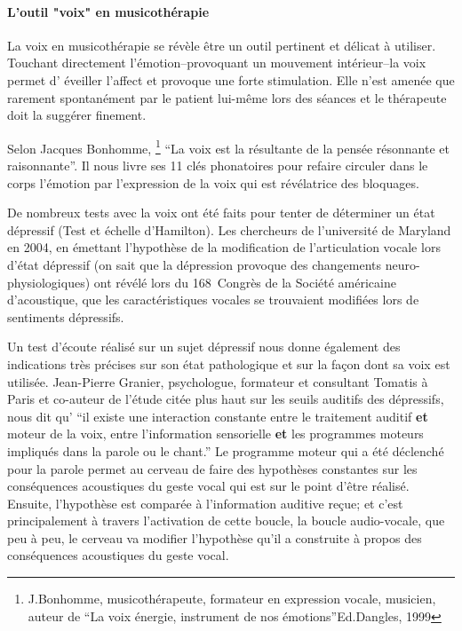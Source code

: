 \paragraph{L'outil "voix" en musicothérapie}

La voix en musicothérapie se révèle être un outil pertinent et délicat
à utiliser. Touchant 
directement 
l'émotion--provoquant un mouvement intérieur--la voix permet d'
éveiller l'affect
et provoque une forte stimulation. Elle n'est amenée que rarement
spontanément par le patient lui-même lors des séances et le thérapeute doit la suggérer
finement.

Selon Jacques Bonhomme, \footnote{J.Bonhomme, musicothérapeute, formateur 
  	en expression vocale, musicien, auteur de ``La voix énergie,
        instrument de nos émotions''Ed.Dangles, 1999} ``La voix est la
      résultante de la pensée résonnante et raisonnante''.
      Il nous livre ses 11 clés phonatoires pour refaire circuler dans
      le corps 
      l'émotion par l'expression de la voix qui est révélatrice des bloquages.

De nombreux tests avec 
la voix
 ont été faits pour tenter de déterminer un état dépressif 
(Test et échelle d'Hamilton). Les chercheurs de l'université de Maryland en 
2004,
en émettant l'hypothèse de la modification de l'articulation vocale 
lors d'état dépressif (on sait que la dépression provoque des changements  
neuro-physiologiques) ont révélé lors du 168\ieme\ Congrès de la Société
américaine d'acoustique, que les caractéristiques 
vocales se trouvaient modifiées lors de sentiments 
dépressifs\autocite{le_service_metronews}.



Un test d'écoute réalisé sur un sujet dépressif nous donne également des indications
très précises sur son état
pathologique et sur la façon dont sa voix est utilisée. Jean-Pierre
Granier, psychologue, formateur et consultant Tomatis à Paris et
co-auteur de l'étude citée plus haut sur les seuils auditifs des dépressifs, nous dit qu' 
``il existe une 
interaction
constante entre le traitement auditif \textbf{et} moteur de la
voix, entre l'information sensorielle \textbf{et} les programmes moteurs impliqués
dans la parole ou le chant.'' Le programme moteur qui a été déclenché
pour la parole permet au cerveau de faire des hypothèses constantes
sur les conséquences acoustiques du geste vocal qui est sur le point
d'être réalisé. Ensuite, l'hypothèse est comparée à l'information
auditive reçue; et c'est principalement à travers l'activation de cette boucle, la
boucle audio-vocale, que peu à peu, le cerveau va modifier l'hypothèse
qu'il a construite à propos des conséquences acoustiques du geste vocal.





